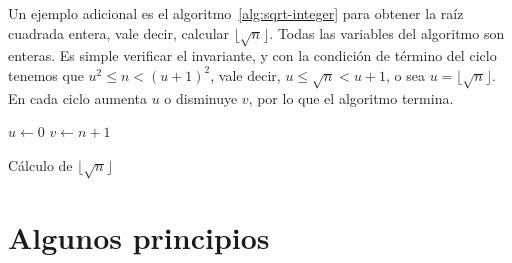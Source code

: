   Un ejemplo adicional es el algoritmo~\ref{alg:sqrt-integer}%
  para obtener la raíz cuadrada entera,
  vale decir,
  calcular \(\lfloor \sqrt{n} \rfloor\).
  Todas las variables del algoritmo son enteras.
  Es simple verificar el invariante,
  y con la condición de término del ciclo
  tenemos que \(u^2 \le n < (u + 1)^2\),
  vale decir,
  \(u \le \sqrt{n} < u + 1\),
  o sea \(u = \lfloor \sqrt{n} \rfloor\).
  En cada ciclo aumenta \(u\) o disminuye \(v\),
  por lo que el algoritmo termina.

  \begin{algorithm}
    \DontPrintSemicolon

    \KwFunction \ISqrt \FuncSty{(}\FuncSty{)} \;
    \BlankLine
    \(u \leftarrow 0\) \;
    \(v \leftarrow n + 1\) \;
     \;
    \caption{Cálculo de $\lfloor \sqrt{n} \rfloor$}
    \label{alg:sqrt-integer}
  \end{algorithm}

\section{Algunos principios}
\label{sec:algunos-principios}

